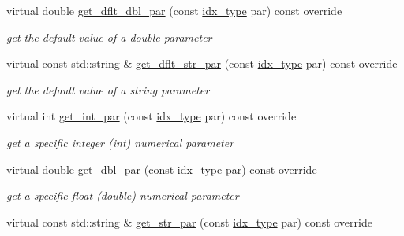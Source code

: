 \begin{Indent}
\begin{DoxyCompactItemize}
virtual double \mbox{\hyperlink{class_s_m_spp__di__unipi__it_1_1_f_real_objective_a465a771c115acf8d5f4e32e22f003014}{get\+\_\+dflt\+\_\+dbl\+\_\+par}} (const \mbox{\hyperlink{class_s_m_spp__di__unipi__it_1_1_thin_compute_interface_aa3d710629ad8c434286726ad810c3b47}{idx\+\_\+type}} par) const override
\begin{DoxyCompactList}\small\item\em get the default value of a double parameter \end{DoxyCompactList}\item 
virtual const std\+::string \& \mbox{\hyperlink{class_s_m_spp__di__unipi__it_1_1_f_real_objective_a4d332ec2a836a87b0bd3b3539752e89f}{get\+\_\+dflt\+\_\+str\+\_\+par}} (const \mbox{\hyperlink{class_s_m_spp__di__unipi__it_1_1_thin_compute_interface_aa3d710629ad8c434286726ad810c3b47}{idx\+\_\+type}} par) const override
\begin{DoxyCompactList}\small\item\em get the default value of a string parameter \end{DoxyCompactList}\item 
virtual int \mbox{\hyperlink{class_s_m_spp__di__unipi__it_1_1_f_real_objective_aaaa5e72533153b149c26c1cc7ab1fe70}{get\+\_\+int\+\_\+par}} (const \mbox{\hyperlink{class_s_m_spp__di__unipi__it_1_1_thin_compute_interface_aa3d710629ad8c434286726ad810c3b47}{idx\+\_\+type}} par) const override
\begin{DoxyCompactList}\small\item\em get a specific integer (int) numerical parameter \end{DoxyCompactList}\item 
virtual double \mbox{\hyperlink{class_s_m_spp__di__unipi__it_1_1_f_real_objective_af7101b9f3e872b6ad9129ab99cff4cb7}{get\+\_\+dbl\+\_\+par}} (const \mbox{\hyperlink{class_s_m_spp__di__unipi__it_1_1_thin_compute_interface_aa3d710629ad8c434286726ad810c3b47}{idx\+\_\+type}} par) const override
\begin{DoxyCompactList}\small\item\em get a specific float (double) numerical parameter \end{DoxyCompactList}\item 
virtual const std\+::string \& \mbox{\hyperlink{class_s_m_spp__di__unipi__it_1_1_f_real_objective_a3e17318e51ccc01da85e2627b810d6a7}{get\+\_\+str\+\_\+par}} (const \mbox{\hyperlink{class_s_m_spp__di__unipi__it_1_1_thin_compute_interface_aa3d710629ad8c434286726ad810c3b47}{idx\+\_\+type}} par) const override

\end{DoxyCompactItemize}
\end{Indent}
